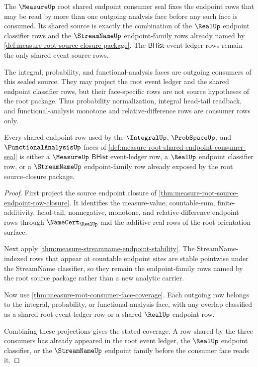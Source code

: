 \begin{definition}
\label{def:measure-root-shared-endpoint-consumer-seal}
The $\MeasureUp$ root shared endpoint consumer seal fixes the endpoint rows
that may be read by more than one outgoing analysis face before any such face
is consumed. Its shared source is exactly the combination of the $\RealUp$
endpoint classifier rows and the $\StreamNameUp$ endpoint-family rows already
named by \autoref{def:measure-root-source-closure-package}. The
$\mathsf{BHist}$ event-ledger rows remain the only shared event source rows.

The integral, probability, and functional-analysis faces are outgoing
consumers of this sealed source. They may project the root event ledger and
the shared endpoint classifier rows, but their face-specific rows are not
source hypotheses of the root package. Thus probability normalization,
integral head-tail readback, and functional-analysis monotone and
relative-difference rows are consumer rows only.
\end{definition}

\begin{theorem}
\label{thm:measure-root-shared-endpoint-coverage}
Every shared endpoint row used by the $\IntegralUp$, $\ProbSpaceUp$, and
$\FunctionalAnalysisUp$ faces of
\autoref{def:measure-root-shared-endpoint-consumer-seal} is either a
$\MeasureUp$ $\mathsf{BHist}$ event-ledger row, a $\RealUp$ endpoint
classifier row, or a $\StreamNameUp$ endpoint-family row already exposed by
the root source-closure package.
\end{theorem}
\begin{proof}
First project the source endpoint closure of
\autoref{thm:measure-root-source-endpoint-row-closure}. It identifies the
measure-value, countable-sum, finite-additivity, head-tail, nonnegative,
monotone, and relative-difference endpoint rows through $\NameCert_{\RealUp}$
and the additive real rows of the root orientation surface.

Next apply \autoref{thm:measure-streamname-endpoint-stability}. The
StreamName-indexed rows that appear at countable endpoint sites are stable
pointwise under the StreamName classifier, so they remain the endpoint-family
rows named by the root source package rather than a new analytic carrier.

Now use \autoref{thm:measure-root-consumer-face-coverage}. Each outgoing row
belongs to the integral, probability, or functional-analysis face, with any
overlap classified as a shared root event-ledger row or a shared $\RealUp$
endpoint row.

Combining these projections gives the stated coverage. A row shared by the
three consumers has already appeared in the root event ledger, the $\RealUp$
endpoint classifier, or the $\StreamNameUp$ endpoint family before the
consumer face reads it.
\end{proof}

